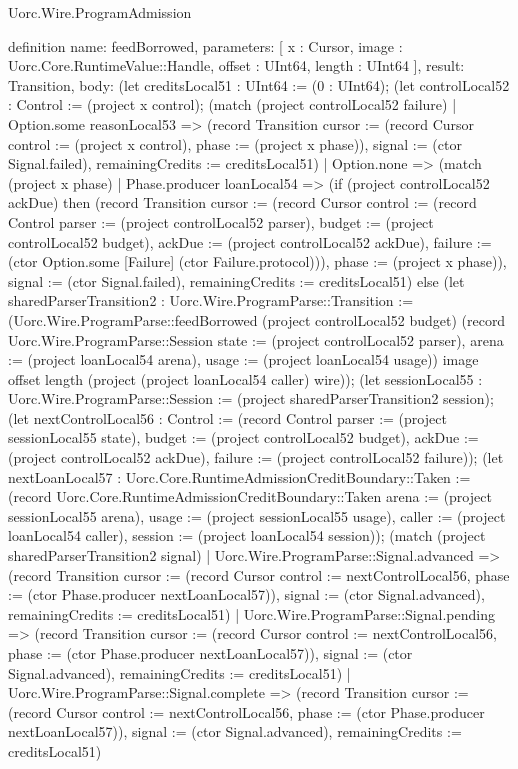 \begin{lexlean}{Uorc.Wire.ProgramAdmission}
\begin{semanticmodule}
definition{
  name: feedBorrowed,
  parameters: [
    x : Cursor,
    image : Uorc.Core.RuntimeValue::Handle,
    offset : UInt64,
    length : UInt64
  ],
  result: Transition,
  body: (let creditsLocal51 : UInt64 := (0 : UInt64); (let controlLocal52 : Control := (project x control); (match (project controlLocal52 failure)
    | Option.some reasonLocal53 => (record Transition {cursor := (record Cursor {control := (project x control), phase := (project x phase)}), signal := (ctor Signal.failed), remainingCredits := creditsLocal51})
    | Option.none => (match (project x phase)
      | Phase.producer loanLocal54 => (if (project controlLocal52 ackDue) then (record Transition {cursor := (record Cursor {control := (record Control {parser := (project controlLocal52 parser), budget := (project controlLocal52 budget), ackDue := (project controlLocal52 ackDue), failure := (ctor Option.some [Failure] (ctor Failure.protocol))}), phase := (project x phase)}), signal := (ctor Signal.failed), remainingCredits := creditsLocal51}) else (let sharedParserTransition2 : Uorc.Wire.ProgramParse::Transition := (Uorc.Wire.ProgramParse::feedBorrowed (project controlLocal52 budget) (record Uorc.Wire.ProgramParse::Session {state := (project controlLocal52 parser), arena := (project loanLocal54 arena), usage := (project loanLocal54 usage)}) image offset length (project (project loanLocal54 caller) wire)); (let sessionLocal55 : Uorc.Wire.ProgramParse::Session := (project sharedParserTransition2 session); (let nextControlLocal56 : Control := (record Control {parser := (project sessionLocal55 state), budget := (project controlLocal52 budget), ackDue := (project controlLocal52 ackDue), failure := (project controlLocal52 failure)}); (let nextLoanLocal57 : Uorc.Core.RuntimeAdmissionCreditBoundary::Taken := (record Uorc.Core.RuntimeAdmissionCreditBoundary::Taken {arena := (project sessionLocal55 arena), usage := (project sessionLocal55 usage), caller := (project loanLocal54 caller), session := (project loanLocal54 session)}); (match (project sharedParserTransition2 signal)
        | Uorc.Wire.ProgramParse::Signal.advanced => (record Transition {cursor := (record Cursor {control := nextControlLocal56, phase := (ctor Phase.producer nextLoanLocal57)}), signal := (ctor Signal.advanced), remainingCredits := creditsLocal51})
        | Uorc.Wire.ProgramParse::Signal.pending => (record Transition {cursor := (record Cursor {control := nextControlLocal56, phase := (ctor Phase.producer nextLoanLocal57)}), signal := (ctor Signal.advanced), remainingCredits := creditsLocal51})
        | Uorc.Wire.ProgramParse::Signal.complete => (record Transition {cursor := (record Cursor {control := nextControlLocal56, phase := (ctor Phase.producer nextLoanLocal57)}), signal := (ctor Signal.advanced), remainingCredits := creditsLocal51})
}
\end{semanticmodule}
\end{lexlean}
